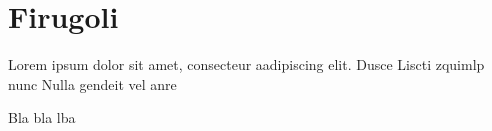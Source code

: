 \chapter{Firugoli}

Lorem ipsum dolor sit amet, consecteur aadipiscing elit. Dusce Liscti zquimlp nunc Nulla gendeit vel anre 

Bla bla lba
